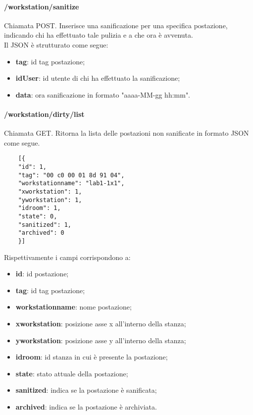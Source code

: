 \paragraph{/workstation/sanitize}
Chiamata POST. Inserisce una sanificazione per una specifica postazione, indicando chi ha effettuato tale pulizia e a che ora è avvenuta.\\
Il JSON è strutturato come segue:
\begin{itemize}
	\item \textbf{tag}: id tag postazione;
	\item \textbf{idUser}: id utente di chi ha effettuato la sanificazione;
	\item \textbf{data}: ora sanificazione in formato "aaaa-MM-gg hh:mm".
\end{itemize}

\paragraph{/workstation/dirty/list}
Chiamata GET. Ritorna la lista delle postazioni non sanificate in formato JSON come segue.	\\
\begin{center}
	\begin{lstlisting}
	[{
	"id": 1, 
	"tag": "00 c0 00 01 8d 91 04",
	"workstationname": "lab1-1x1",
	"xworkstation": 1, 
	"yworkstation": 1, 
	"idroom": 1,
	"state": 0,
	"sanitized": 1,
	"archived": 0
	}]
	\end{lstlisting}
\end{center}
Rispettivamente i campi corrispondono a:
\begin{itemize}
	\item \textbf{id}: id postazione;
	\item \textbf{tag}: id tag postazione;
	\item \textbf{workstationname}: nome postazione;
	\item \textbf{xworkstation}: posizione asse x all'interno della stanza;
	\item \textbf{yworkstation}: posizione asse y all'interno della stanza;	
	\item \textbf{idroom}: id stanza in cui è presente la postazione;	
	\item \textbf{state}: stato attuale della postazione;	
	\item \textbf{sanitized}: indica se la postazione è sanificata;	
	\item \textbf{archived}: indica se la postazione è archiviata.	
\end{itemize}
